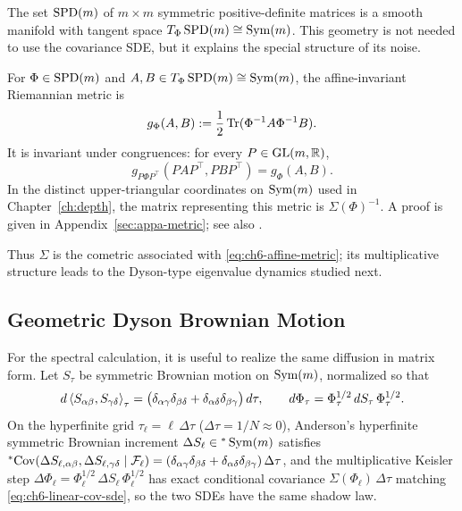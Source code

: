 The set $\operatorname{SPD}(m)$ of $m \times m$ symmetric positive-definite matrices is a smooth manifold with tangent space $T_\Phi \operatorname{SPD}(m) \cong \operatorname{Sym}(m)$. This geometry is not needed to use the covariance SDE, but it explains the special structure of its noise.

\begin{proposition}
\label{prop:affine-metric}
For $\Phi \in \operatorname{SPD}(m)$ and $A, B \in T_\Phi \operatorname{SPD}(m) \cong \operatorname{Sym}(m)$, the affine-invariant Riemannian metric is
\begin{equation}
\label{eq:ch6-affine-metric}
g_\Phi(A, B) := \frac{1}{2}\operatorname{Tr}(\Phi^{-1} A \Phi^{-1} B).
\end{equation}
It is invariant under congruences: for every $P \in \operatorname{GL}(m, \mathbb{R})$,
\begin{equation}
\label{eq:ch6-metric-invariance}
g_{P\Phi P^\top}(P A P^\top, P B P^\top) = g_\Phi(A, B).
\end{equation}
In the distinct upper-triangular coordinates on $\operatorname{Sym}(m)$ used in Chapter~\ref{ch:depth}, the matrix representing this metric is $\Sigma(\Phi)^{-1}$. A proof is given in Appendix~\ref{sec:appa-metric}; see also \cite[Proposition 2.5]{li2026geometric}.
\end{proposition}

Thus $\Sigma$ is the cometric associated with \eqref{eq:ch6-affine-metric}; its multiplicative structure leads to the Dyson-type eigenvalue dynamics studied next.

\subsection{Geometric Dyson Brownian Motion}
\label{subsec:geom-dyson-bm}

For the spectral calculation, it is useful to realize the same diffusion in matrix form. Let $S_\tau$ be symmetric Brownian motion on $\operatorname{Sym}(m)$, normalized so that
\begin{equation}
\label{eq:ch6-sym-bm-sde}
d\left\langle S_{\alpha\beta}, S_{\gamma\delta} \right\rangle_\tau = \bigl(\delta_{\alpha\gamma}\delta_{\beta\delta} + \delta_{\alpha\delta}\delta_{\beta\gamma}\bigr)\,d\tau, \qquad
d\Phi_\tau = \Phi_\tau^{1/2}\,dS_\tau\,\Phi_\tau^{1/2}.
\end{equation}
On the hyperfinite grid $\tau_\ell = \ell\,\Delta\tau$ ($\Delta\tau = 1/N \approx 0$), Anderson's hyperfinite symmetric Brownian increment $\Delta S_\ell \in {}^*\operatorname{Sym}(m)$ satisfies ${}^*\!\operatorname{Cov}(\Delta S_{\ell,\alpha\beta}, \Delta S_{\ell,\gamma\delta} \mid \mathcal{F}_\ell) = (\delta_{\alpha\gamma}\delta_{\beta\delta} + \delta_{\alpha\delta}\delta_{\beta\gamma})\,\Delta\tau$, and the multiplicative Keisler step $\Delta\Phi_\ell = \Phi_\ell^{1/2}\,\Delta S_\ell\,\Phi_\ell^{1/2}$ has exact conditional covariance $\Sigma(\Phi_\ell)\,\Delta\tau$ matching \eqref{eq:ch6-linear-cov-sde}, so the two SDEs have the same shadow law.

